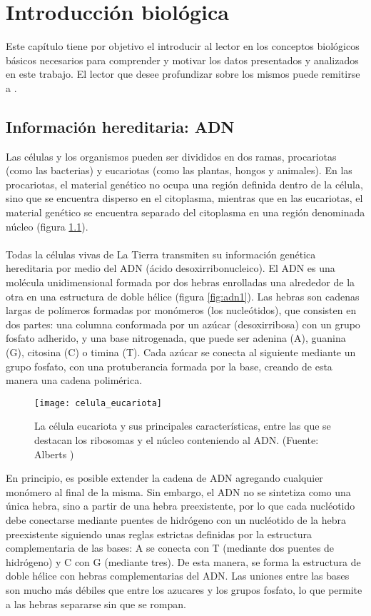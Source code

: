 \chapter{Introducción biológica}
Este capítulo tiene por objetivo el introducir al lector en los conceptos biológicos básicos necesarios para comprender y motivar los datos presentados y analizados en este trabajo. El lector que desee profundizar sobre los mismos puede remitirse a \cite{Domany2003, Alberts2015}.
\section{Información hereditaria: ADN}
Las células y los organismos pueden ser divididos en dos ramas, procariotas (como las bacterias) y eucariotas (como las plantas, hongos y animales). En las procariotas, el material genético no ocupa una región definida dentro de la célula, sino que se encuentra disperso en el citoplasma, mientras que en las eucariotas, el material genético se encuentra separado del citoplasma en una región denominada núcleo (figura \ref{fig:celula_eucariota}).\\\\
Todas la células vivas de La Tierra transmiten su información genética hereditaria por medio del ADN (ácido desoxirribonucleico). El ADN es una molécula unidimensional formada por dos hebras enrolladas una alrededor de la otra en una estructura de doble hélice (figura \ref{fig:adn1}). Las hebras son cadenas largas de polímeros formadas por monómeros (los nucleótidos), que consisten en dos partes: una columna conformada por un azúcar (desoxirribosa) con un grupo fosfato adherido, y una base nitrogenada, que puede ser adenina (A), guanina (G), citosina (C) o timina (T). Cada azúcar se conecta al siguiente mediante un grupo fosfato, con una protuberancia formada por la base, creando de esta manera una cadena polimérica. 
\begin{figure}[h]
    \centering
    \texttt{[image: celula\_eucariota]}
    \caption{La célula eucariota y sus principales características, entre las que se destacan los ribosomas y el núcleo conteniendo al ADN. (Fuente: Alberts \cite{Alberts2015})}
    \label{fig:celula_eucariota}
\end{figure}
En principio, es posible extender la cadena de ADN agregando cualquier monómero al final de la misma. Sin embargo, el ADN no se sintetiza como una única hebra, sino a partir de una hebra preexistente, por lo que cada nucléotido debe conectarse mediante puentes de hidrógeno con un nucléotido de la hebra preexistente siguiendo unas reglas estrictas definidas por la estructura complementaria de las bases: A se conecta con T (mediante dos puentes de hidrógeno) y C con G (mediante tres). De esta manera, se forma la estructura de doble hélice con hebras complementarias del ADN. Las uniones entre las bases son mucho más débiles que entre los azucares y los grupos fosfato, lo que permite a las hebras separarse sin que se rompan.\\\\
